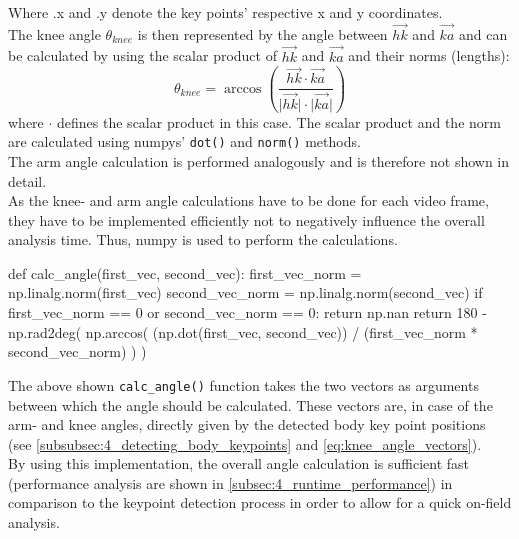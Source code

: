 \noindent Where .x and .y denote the key points' respective x and y coordinates.\\
The knee angle $\theta_{knee}$ is then represented by the angle
between $\vec{hk}$ and $\vec{ka}$ and can be calculated by using the scalar
product of $\vec{hk}$ and $\vec{ka}$ and their norms (lengths):
\begin{equation}\label{eq:knee_angle}
    \theta_{knee} = \arccos\left(\frac{\vec{hk} \cdot \vec{ka}}{\lvert \vec{hk} \rvert \cdot \lvert \vec{ka} \rvert}\right)
\end{equation}
where $\cdot$ defines the scalar product in this case.
The scalar product and the norm are calculated using numpys'
\texttt{dot()} and \texttt{norm()} methods.\\
The arm angle calculation is performed analogously and is therefore not shown
in detail.\\
As the knee- and arm angle calculations have to be done for each video frame,
they have to be implemented efficiently not to negatively influence the
overall analysis time.
Thus, numpy is used to perform the calculations.
\begin{pythoncode}[caption=Angle calculation,label=alg:angle_calc_algo]
    def calc_angle(first_vec, second_vec):
        first_vec_norm = np.linalg.norm(first_vec)
        second_vec_norm = np.linalg.norm(second_vec)
        if first_vec_norm == 0 or second_vec_norm == 0:
            return np.nan
        return 180 - np.rad2deg(
            np.arccos(
                (np.dot(first_vec, second_vec))
                / (first_vec_norm * second_vec_norm)
            )
        )
\end{pythoncode}
The above shown \texttt{calc\_angle()} function takes the two vectors as
arguments between which the angle should be calculated.
These vectors are, in case of the arm- and knee angles, directly given by the
detected body key point positions (see
\autoref{subsubsec:4_detecting_body_keypoints} and
\autoref{eq:knee_angle_vectors}).\\
By using this implementation, the overall angle calculation is sufficient fast
(performance analysis are shown in \autoref{subsec:4_runtime_performance})
in comparison to the keypoint detection process in order to allow for a quick
on-field analysis.

